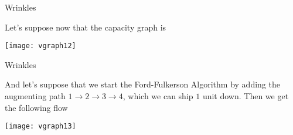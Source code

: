 \begin{frame}[fragile]{Wrinkles}


Let's suppose now that the capacity graph is

\begin{center}
\texttt{[image: vgraph12]}
\end{center}




\end{frame}
\begin{frame}[fragile]{Wrinkles}

And let's suppose that we start the Ford-Fulkerson Algorithm by adding the augmenting path $1\rightarrow2\rightarrow3\rightarrow4$, which we can ship $1$ unit down.  Then we get the following flow


\begin{center}
\texttt{[image: vgraph13]}
\end{center}



\end{frame}
